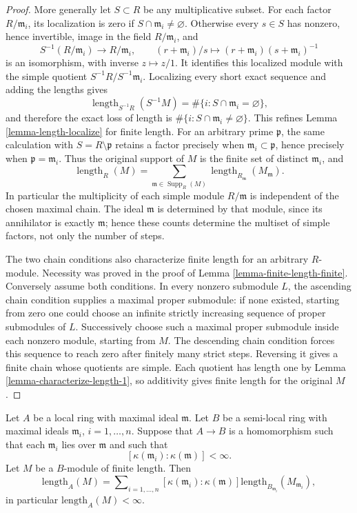 \begin{proof}
More generally let $S\subset R$ be any multiplicative subset.
For each factor $R/\mathfrak m_i$, its localization is zero
if $S\cap\mathfrak m_i\neq\varnothing$. Otherwise every
$s\in S$ has nonzero, hence invertible, image in the field
$R/\mathfrak m_i$, and
$$
S^{-1}(R/\mathfrak m_i)\longrightarrow R/\mathfrak m_i,
\qquad (r+\mathfrak m_i)/s\longmapsto
(r+\mathfrak m_i)(s+\mathfrak m_i)^{-1}
$$
is an isomorphism, with inverse $z\mapsto z/1$.
It identifies this localized module with the simple quotient
$S^{-1}R/S^{-1}\mathfrak m_i$.
Localizing every short exact sequence and adding the lengths gives
$$
\operatorname{length}_{S^{-1}R}(S^{-1}M)
=\#\{i: S\cap\mathfrak m_i=\varnothing\},
$$
and therefore the exact loss of length is
$\#\{i:S\cap\mathfrak m_i\neq\varnothing\}$.
This refines Lemma \ref{lemma-length-localize} for finite length.
For an arbitrary prime $\mathfrak p$, the same calculation with
$S=R\setminus\mathfrak p$ retains a factor precisely when
$\mathfrak m_i\subset\mathfrak p$, hence precisely when
$\mathfrak p=\mathfrak m_i$.
Thus the original support of $M$ is the finite set of distinct
$\mathfrak m_i$, and
$$
\operatorname{length}_R(M)
=\sum_{\mathfrak m\in\operatorname{Supp}_R(M)}
  \operatorname{length}_{R_{\mathfrak m}}(M_{\mathfrak m}).
$$
In particular the multiplicity of each simple module
$R/\mathfrak m$ is independent of the chosen maximal chain.
The ideal $\mathfrak m$ is determined by that module, since
its annihilator is exactly $\mathfrak m$; hence these counts
determine the multiset of simple factors, not only the number
of steps.

The two chain conditions also characterize finite length for
an arbitrary $R$-module. Necessity was proved in the proof of
Lemma \ref{lemma-finite-length-finite}.
Conversely assume both conditions. In every nonzero submodule
$L$, the ascending chain condition supplies a maximal proper
submodule: if none existed, starting from zero one could choose
an infinite strictly increasing sequence of proper submodules
of $L$. Successively choose such a maximal proper submodule
inside each nonzero module, starting from $M$.
The descending chain condition forces this sequence to reach
zero after finitely many strict steps. Reversing it gives a
finite chain whose quotients are simple. Each quotient has
length one by Lemma \ref{lemma-characterize-length-1}, so
additivity gives finite length for the original $M$.
\end{proof}

\begin{lemma}
\label{lemma-pushdown-module}
Let $A$ be a local ring with maximal ideal $\mathfrak m$.
Let $B$ be a semi-local ring with maximal ideals $\mathfrak m_i$,
$i = 1, \ldots, n$.
Suppose that $A \to B$ is a homomorphism such that each $\mathfrak m_i$
lies over $\mathfrak m$ and such that
$$
[\kappa(\mathfrak m_i) : \kappa(\mathfrak m)] < \infty.
$$
Let $M$ be a $B$-module of finite length.
Then
$$
\text{length}_A(M) = \sum\nolimits_{i = 1, \ldots, n}
[\kappa(\mathfrak m_i) : \kappa(\mathfrak m)]
\text{length}_{B_{\mathfrak m_i}}(M_{\mathfrak m_i}),
$$
in particular $\text{length}_A(M) < \infty$.
\end{lemma}

